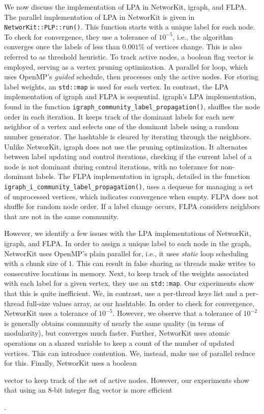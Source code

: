 We now discuss the implementation of LPA in NetworKit, igraph, and FLPA. The parallel implementation of LPA in NetworKit is given in \texttt{NetworKit::PLP::run()}. This function starts with a unique label for each node. To check for convergence, they use a tolerance of $10^{-5}$, i.e., the algorithm converges once the labels of less than $0.001\%$ of vertices change. This is also referred to as threshold heuristic. To track active nodes, a boolean flag vector is employed, serving as a vertex pruning optimization. A parallel for loop, which uses OpenMP's \textit{guided} schedule, then processes only the active nodes. For storing label weights, an \texttt{std::map} is used for each vertex. In contrast, the LPA implementation of igraph and FLPA is sequential. igraph's LPA implementation, found in the function \texttt{igraph\_community\_label\_propagation()}, shuffles the node order in each iteration. It keeps track of the dominant labels for each new neighbor of a vertex and selects one of the dominant labels using a random number generator. The hashtable is cleared by iterating through the neighbors. Unlike NetworKit, igraph does not use the pruning optimization. It alternates between label updating and control iterations, checking if the current label of a node is not dominant during control iterations, with no tolerance for non-dominant labels. The FLPA implementation in igraph, detailed in the function \texttt{igraph\_i\_community\_label\_propagation()}, uses a dequeue for managing a set of unprocessed vertices, which indicates convergence when empty. FLPA does not shuffle for random node order. If a label change occurs, FLPA considers neighbors that are not in the same community.

However, we identify a few issues with the LPA implementations of NetworKit, igraph, and FLPA. In order to assign a unique label to each node in the graph, NetworKit uses OpenMP's plain parallel for, i.e., it uses \textit{static} loop scheduling with a chunk size of $1$. This can result in false sharing as threads make writes to consecutive locations in memory. Next, to keep track of the weights associated with each label for a given vertex, they use an \texttt{std::map}. Our experiments show that this is quite inefficient. We, in contrast, use a per-thread keys list and a per-thread full-size values array, as our hashtable. In order to check for convergence, NetworKit uses a tolerance of $10^{-5}$. However, we observe that a tolerance of $10^{-2}$ is generally obtains community of nearly the same quality (in terms of modularity), but converges much faster. Further, NetworKit uses atomic operations on a shared variable to keep a count of the number of updated vertices. This can introduce contention. We, instead, make use of parallel reduce for this. Finally, NetworKit uses a boolean vector to keep track of the set of active nodes. However, our experiments show that using an 8-bit integer flag vector is more efficient.

